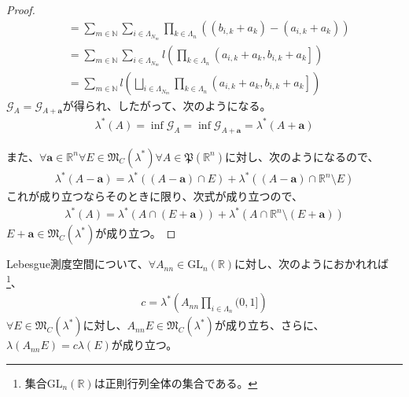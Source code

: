 \documentclass[dvipdfmx]{jsarticle}
\begin{document}
\begin{proof}
\begin{align*}
&= \sum_{m \in \mathbb{N}} {\sum_{i \in \varLambda_{N_{m}}} {\prod_{k \in \varLambda_{n}} \left( \left( b_{i,k} + a_{k} \right) - \left( a_{i,k} + a_{k} \right) \right)}}\\
&= \sum_{m \in \mathbb{N}} {\sum_{i \in \varLambda_{N_{m}}} {l\left( \prod_{k \in \varLambda_{n}} \left( a_{i,k} + a_{k},b_{i,k} + a_{k} \right] \right)}}\\
&= \sum_{m \in \mathbb{N}} {l\left( \bigsqcup_{i \in \varLambda_{N_{m}}} {\prod_{k \in \varLambda_{n}} \left( a_{i,k} + a_{k},b_{i,k} + a_{k} \right]} \right)}
\end{align*}
$\mathcal{G}_{A} = \mathcal{G}_{A + \mathbf{a}}$が得られ、したがって、次のようになる。
\begin{align*}
\lambda^{*}(A) = \inf\mathcal{G}_{A} = \inf\mathcal{G}_{A + \mathbf{a}} = \lambda^{*}\left( A + \mathbf{a} \right)
\end{align*}\par
また、$\forall\mathbf{a} \in \mathbb{R}^{n}\forall E \in \mathfrak{M}_{C}\left( \lambda^{*} \right)\forall A \in \mathfrak{P}\left( \mathbb{R}^{n} \right)$に対し、次のようになるので、
\begin{align*}
\lambda^{*}\left( A - \mathbf{a} \right) = \lambda^{*}\left( \left( A - \mathbf{a} \right) \cap E \right) + \lambda^{*}\left( \left( A - \mathbf{a} \right) \cap \mathbb{R}^{n} \setminus E \right)
\end{align*}
これが成り立つならそのときに限り、次式が成り立つので、
\begin{align*}
\lambda^{*}(A) = \lambda^{*}\left( A \cap \left( E + \mathbf{a} \right) \right) + \lambda^{*}\left( A \cap \mathbb{R}^{n} \setminus \left( E + \mathbf{a} \right) \right)
\end{align*}
$E + \mathbf{a} \in \mathfrak{M}_{C}\left( \lambda^{*} \right)$が成り立つ。
\end{proof}
\begin{thm}\label{4.5.4.20r}
Lebesgue測度空間について、$\forall A_{nn} \in \mathrm{GL}_{n}\left( \mathbb{R} \right)$に対し、次のようにおかれれば\footnote{集合$\mathrm{GL}_{n}\left( \mathbb{R} \right)$は正則行列全体の集合である。}、
\begin{align*}
c = \lambda^{*}\left( A_{nn}\prod_{i \in \varLambda_{n}} (0,1] \right)
\end{align*}
$\forall E \in \mathfrak{M}_{C}\left( \lambda^{*} \right)$に対し、$A_{nn}E \in \mathfrak{M}_{C}\left( \lambda^{*} \right)$が成り立ち、さらに、$\lambda\left( A_{nn}E \right) = c\lambda(E)$が成り立つ。
\end{thm}\par
\end{document}

